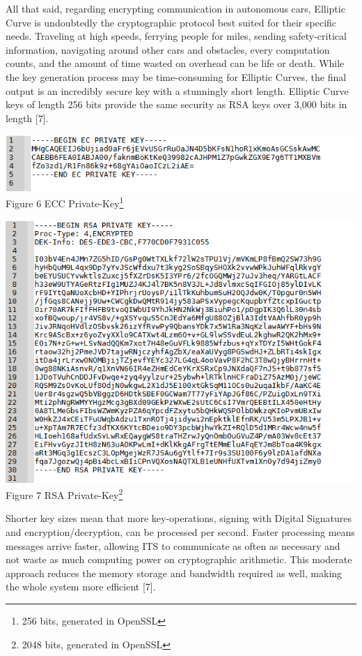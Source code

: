 \documentclass[conference,compsoc]{IEEEtran}
\begin{document}
All that said, regarding encrypting communication in autonomous cars, Elliptic Curve is undoubtedly the cryptographic protocol best suited for their specific needs. Traveling at high speeds, ferrying people for miles, sending safety-critical information, navigating around other cars and obstacles, every computation counts, and the amount of time wasted on overhead can be life or death. While the key generation process may be time-consuming for Elliptic Curves, the final output is an incredibly secure key with a stunningly short length. Elliptic Curve keys of length 256 bits provide the same security as RSA keys over 3,000 bits in length [7].
\begin{center}
\includegraphics[scale = .58]{ecc.png}
\small {Figure 6 ECC Private-Key\footnote{256 bits, generated in OpenSSL}}
\break
\end{center}
\begin{center}
\includegraphics[scale = .58]{rsa.png}
\small{Figure 7 RSA Private-Key\footnote{2048 bits, generated in OpenSSL}}
\break
\end{center}
Shorter key sizes mean that more key-operations, signing with Digital Signatures and encryption/decryption, can be processed per second. Faster processing means messages arrive faster, allowing ITS to communicate as often as necessary and not waste as much computing power on cryptographic arithmetic. This moderate approach reduces the memory storage and bandwidth required as well, making the whole system more efficient [7].
\end{document}
